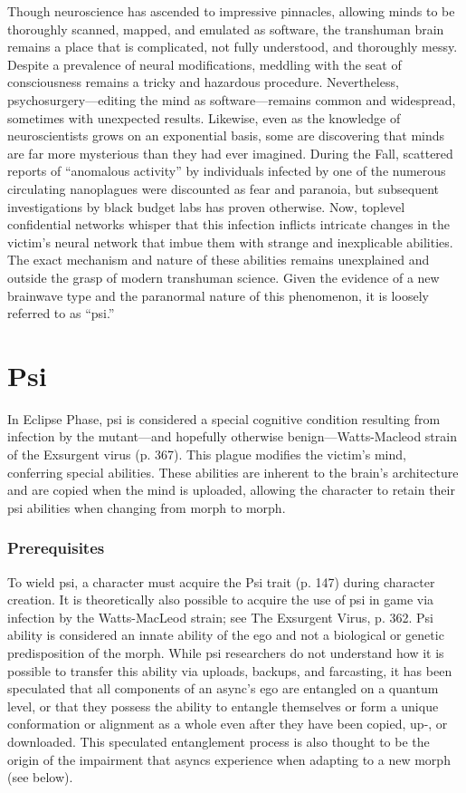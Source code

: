 \newpage

Though neuroscience has ascended to impressive
pinnacles, allowing minds to be thoroughly scanned,
mapped, and emulated as software, the transhuman
brain remains a place that is complicated, not fully
understood, and thoroughly messy. Despite a prevalence
of neural modifications, meddling with the seat
of consciousness remains a tricky and hazardous
procedure. Nevertheless, psychosurgery—editing the
mind as software—remains common and widespread,
sometimes with unexpected results.
Likewise, even as the knowledge of neuroscientists
grows on an exponential basis, some are discovering
that minds are far more mysterious than they had ever
imagined. During the Fall, scattered reports of “anomalous
activity” by individuals infected by one of the
numerous circulating nanoplagues were discounted
as fear and paranoia, but subsequent investigations
by black budget labs has proven otherwise. Now, toplevel
confidential networks whisper that this infection
inflicts intricate changes in the victim’s neural network
that imbue them with strange and inexplicable abilities.
The exact mechanism and nature of these abilities
remains unexplained and outside the grasp of modern
transhuman science. Given the evidence of a new
brainwave type and the paranormal nature of this
phenomenon, it is loosely referred to as “psi.”

\section{Psi}
In Eclipse Phase, psi is considered a special cognitive
condition resulting from infection by the mutant—and
hopefully otherwise benign—Watts-Macleod strain
of the Exsurgent virus (p. 367). This plague modifies
the victim’s mind, conferring special abilities. These
abilities are inherent to the brain’s architecture and
are copied when the mind is uploaded, allowing the
character to retain their psi abilities when changing
from morph to morph.

\subsubsection{Prerequisites}

To wield psi, a character must acquire the Psi trait (p.
147) during character creation. It is theoretically also
possible to acquire the use of psi in game via infection
by the Watts-MacLeod strain; see The Exsurgent
Virus, p. 362.
Psi ability is considered an innate ability of the
ego and not a biological or genetic predisposition of
the morph. While psi researchers do not understand
how it is possible to transfer this ability via uploads,
backups, and farcasting, it has been speculated that
all components of an async’s ego are entangled on a
quantum level, or that they possess the ability to entangle
themselves or form a unique conformation or
alignment as a whole even after they have been copied,
up-, or downloaded. This speculated entanglement
process is also thought to be the origin of the impairment
that asyncs experience when adapting to a new
morph (see below).

